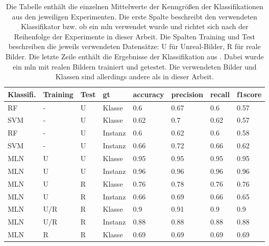 \begin{table}
\centering
{}
\begin{tabularx}{\textwidth}{Xlllllll}
\textbf{Klassifi.}	&\textbf{Training}&\textbf{Test}&	\textbf{\gls{gt}}	& \textbf{\gls{accuracy}} & \textbf{\gls{precision}}	& \textbf{\gls{recall}}	& \textbf{\gls{f1score}} \\ \hline
RF	&-	&U	&Klasse		&0.6	&0.67	&0.6	&0.57	\\
SVM	&-	&U	&Klasse		&0.62	&0.7	&0.62	&0.57	\\
RF	&-	&U	&Instanz	&0.6	&0.62	&0.6	&0.58	\\
SVM	&-	&U	&Instanz	&0.66	&0.72	&0.66	&0.62	\\ \hline
MLN	&U	&U	&Klasse		&0.95	&0.95	&0.95	&0.95	\\
MLN	&U	&U	&Instanz	&0.96	&0.96	&0.96	&0.96	\\ \hline
MLN	&U	&R	&Klasse		&0.76	&0.78	&0.76	&0.76	\\
MLN	&U	&R	&Instanz	&0.66	&0.69	&0.66	&0.65	\\ \hline
MLN	&U/R&R	&Klasse		&0.9	&0.91	&0.9	&0.9	\\
MLN	&U/R&R	&Instanz	&0.88	&0.88	&0.88	&0.88	\\ \hline \hline
MLN &R	&R	&Klasse 	&0.69	&0.69	&0.69	&0.69 \\ 
\end{tabularx}
\caption[Übersicht der Kenngrößen der einzelnen Experimente]{Die Tabelle enthält die einzelnen Mittelwerte der Kenngrößen der Klassifikationen aus den jeweiligen Experimenten. Die erste Spalte beschreibt den verwendeten Klassifikator bzw. ob ein \gls{mln} verwendet wurde und richtet sich nach der Reihenfolge der Experimente in dieser Arbeit. Die Spalten Training und Test beschreiben die jeweils verwendeten Datensätze: U für Unreal-Bilder, R für reale Bilder. Die letzte Zeile enthält die Ergebnisse der Klassifikation aus \cite{pr2looking}. Dabei wurde ein \gls{mln} mit realen Bildern trainiert und getestet. Die verwendeten Bilder und Klassen sind allerdings andere als in dieser Arbeit.}
\label{tab:classification_all}
\end{table}


